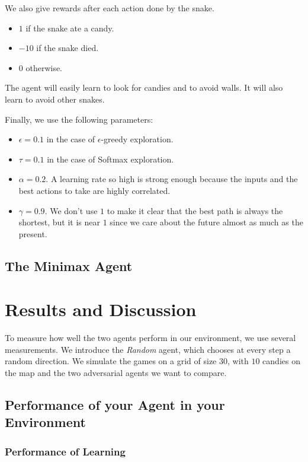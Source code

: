 \documentclass[journal, a4paper]{IEEEtran}
\begin{document}
We also give rewards after each action done by the snake.
\begin{itemize}
    \item $1$ if the snake ate a candy.
    \item $-10$ if the snake died.
    \item $0$ otherwise.
\end{itemize}

The agent will easily learn to look for candies and to avoid walls.
It will also learn to avoid other snakes.

Finally, we use the following parameters:
\begin{itemize}
    \item $\epsilon = 0.1$ in the case of $\epsilon$-greedy exploration.
    \item $\tau = 0.1$ in the case of Softmax exploration.
    \item $\alpha = 0.2$. A learning rate so high is strong enough because the inputs and the best actions to take are highly correlated.
    \item $\gamma = 0.9$. We don't use $1$ to make it clear that the best path is always the shortest, but it is near $1$ since we care about the future almost as much as the present.
\end{itemize}

\subsection{The Minimax Agent}

\section{Results and Discussion}

To measure how well the two agents perform in our environment, we use several measurements.
We introduce the \emph{Random} agent, which chooses at every step a random direction.
We simulate the games on a grid of size $30$, with $10$ candies on the map and the two adversarial agents we want to compare.

\subsection{Performance of your Agent in your Environment}

\subsubsection{Performance of Learning}
\end{document}

